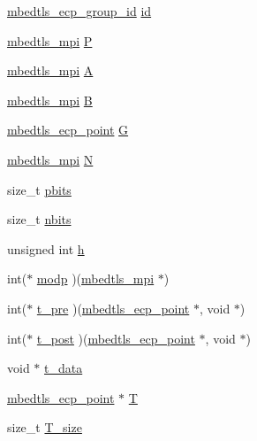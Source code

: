 \begin{DoxyCompactItemize}
\item 
\mbox{\hyperlink{ecp_8h_af79e530ea8f8416480f805baa20b1a2d}{mbedtls\+\_\+ecp\+\_\+group\+\_\+id}} \mbox{\hyperlink{structmbedtls__ecp__group_a3e572cd2e40e1c23fc9a7a6aef7122d6}{id}}
\item 
\mbox{\hyperlink{structmbedtls__mpi}{mbedtls\+\_\+mpi}} \mbox{\hyperlink{structmbedtls__ecp__group_ae049e9c949bf5d30e71b4b31819f6007}{P}}
\item 
\mbox{\hyperlink{structmbedtls__mpi}{mbedtls\+\_\+mpi}} \mbox{\hyperlink{structmbedtls__ecp__group_af6ab87eb277c78f786ca58ed3fd78825}{A}}
\item 
\mbox{\hyperlink{structmbedtls__mpi}{mbedtls\+\_\+mpi}} \mbox{\hyperlink{structmbedtls__ecp__group_ab54c9e6b1807d5c10db76f7ebedd55f4}{B}}
\item 
\mbox{\hyperlink{structmbedtls__ecp__point}{mbedtls\+\_\+ecp\+\_\+point}} \mbox{\hyperlink{structmbedtls__ecp__group_a7e0aca0789ca8f5c38d3a0c98b2f9809}{G}}
\item 
\mbox{\hyperlink{structmbedtls__mpi}{mbedtls\+\_\+mpi}} \mbox{\hyperlink{structmbedtls__ecp__group_a7104724a939b7eef2ae3627db410e1e8}{N}}
\item 
size\+\_\+t \mbox{\hyperlink{structmbedtls__ecp__group_a039ad9e51dc52e46a422e74051b2b837}{pbits}}
\item 
size\+\_\+t \mbox{\hyperlink{structmbedtls__ecp__group_aee5ef1a30d9a5e34810c7a9a7120a10b}{nbits}}
\item 
unsigned int \mbox{\hyperlink{structmbedtls__ecp__group_a3cc458ace9f663e7827a6c3556e75e64}{h}}
\item 
int($\ast$ \mbox{\hyperlink{structmbedtls__ecp__group_ad828ec2b9dcccb7664744fa5b69f561f}{modp}} )(\mbox{\hyperlink{structmbedtls__mpi}{mbedtls\+\_\+mpi}} $\ast$)
\item 
int($\ast$ \mbox{\hyperlink{structmbedtls__ecp__group_a2a4fbe0909b4feb994eaac95e1281cc6}{t\+\_\+pre}} )(\mbox{\hyperlink{structmbedtls__ecp__point}{mbedtls\+\_\+ecp\+\_\+point}} $\ast$, void $\ast$)
\item 
int($\ast$ \mbox{\hyperlink{structmbedtls__ecp__group_aa67390761ba1d1f8b724d1550e451908}{t\+\_\+post}} )(\mbox{\hyperlink{structmbedtls__ecp__point}{mbedtls\+\_\+ecp\+\_\+point}} $\ast$, void $\ast$)
\item 
void $\ast$ \mbox{\hyperlink{structmbedtls__ecp__group_a7400fa2acba24d9b8a7a107d9fcde36f}{t\+\_\+data}}
\item 
\mbox{\hyperlink{structmbedtls__ecp__point}{mbedtls\+\_\+ecp\+\_\+point}} $\ast$ \mbox{\hyperlink{structmbedtls__ecp__group_a4beb01054d800f047b5479f4e0e8d7d8}{T}}
\item 
size\+\_\+t \mbox{\hyperlink{structmbedtls__ecp__group_a4b9a1bf79d2023dbc3807dc7e12059af}{T\+\_\+size}}
\end{DoxyCompactItemize}


